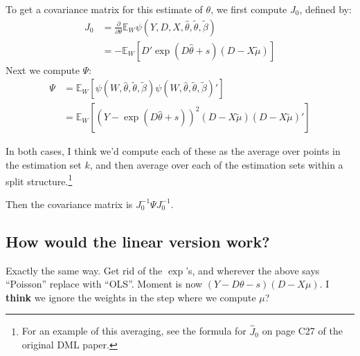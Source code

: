 \documentclass[11pt]{article}
\begin{document}
To get a covariance matrix for this estimate of $\theta$, we first compute $J_0$, defined by:
\begin{align*}
	J_0 &= \frac{\partial}{\partial \theta} \mathbb{E}_W \psi(Y,D,X,\widehat{\theta},\widetilde{\theta}, \widetilde{\beta}) \\
	&= -\mathbb{E}_W\left[D'\exp(D\widehat{\theta} + s)(D - X\widetilde{\mu}) \right]
\end{align*}
Next we compute $\Psi$:
\begin{align*}
	\Psi &= \mathbb{E}_W\left[\psi(W, \widehat{\theta},\widetilde{\theta}, \widetilde{\beta})\psi(W, \widehat{\theta},\widetilde{\theta}, \widetilde{\beta})'\right] \\
		&= \mathbb{E}_W\left[(Y - \exp(D\widehat{\theta} + s))^2(D - X\widetilde{\mu})(D - X\widetilde{\mu})'\right]
\end{align*}

In both cases, I think we'd compute each of these as the average over points in the estimation set $k$, and then average over each of the estimation sets within a split structure.\footnote{For an example of this averaging, see the formula for $\widehat{J}_0$ on page C27 of the original DML paper.} 

Then the covariance matrix is $J_0^{-1} \Psi J_0^{-1}$.

\subsection{How would the linear version work?}
Exactly the same way.  Get rid of the $\exp$'s, and wherever the above says ``Poisson'' replace with ``OLS''.  Moment is now $(Y - D\theta - s)(D - X\mu)$.  I \textbf{think} we ignore the weights in the step where we compute $\mu$?
\end{document}
